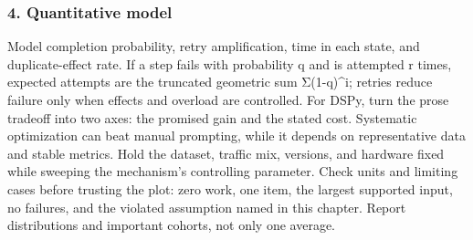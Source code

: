 \subsubsection*{4. Quantitative model}
Model completion probability, retry amplification, time in each state, and duplicate-effect rate. If a step fails with probability q and is attempted r times, expected attempts are the truncated geometric sum Σ(1-q)\textasciicircum{}i; retries reduce failure only when effects and overload are controlled.
For DSPy, turn the prose tradeoff into two axes: the promised gain and the stated cost. Systematic optimization can beat manual prompting, while it depends on representative data and stable metrics. Hold the dataset, traffic mix, versions, and hardware fixed while sweeping the mechanism's controlling parameter.
Check units and limiting cases before trusting the plot: zero work, one item, the largest supported input, no failures, and the violated assumption named in this chapter. Report distributions and important cohorts, not only one average.
